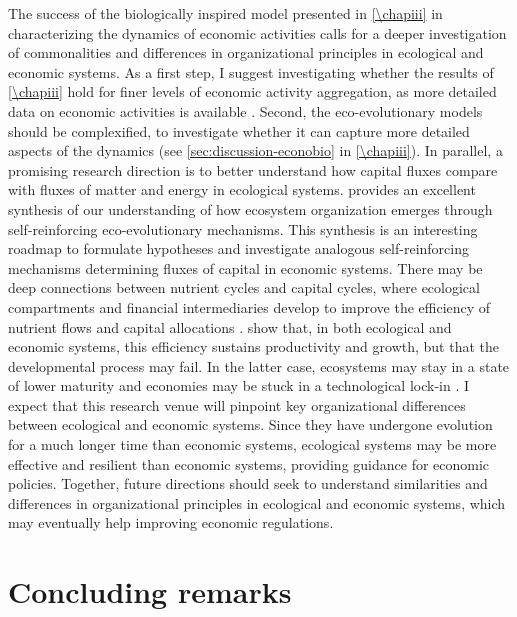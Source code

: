The success of the biologically inspired model presented in \cref{\chapiii}  in characterizing the dynamics of economic activities calls for a deeper investigation of commonalities and differences in organizational principles in ecological and economic systems.
% 
As a first step, I suggest investigating whether the results of \cref{\chapiii} hold for finer levels of economic activity aggregation, as more detailed data on economic activities is available \citep{Hausmann2011}. 
% 
Second, the eco-evolutionary models should be complexified, to investigate whether it can capture more detailed aspects of the dynamics (see \cref{sec:discussion-econobio} in \cref{\chapiii}).
% 
In parallel, a promising research direction is to better understand how capital fluxes \citep{King1993} compare with fluxes of matter and energy \citep{Veldhuis2018} in ecological systems.
% 
\cite{Veldhuis2018} provides an excellent synthesis of our understanding of how ecosystem organization emerges through self-reinforcing eco-evolutionary mechanisms. This synthesis is an interesting roadmap to formulate hypotheses and investigate analogous self-reinforcing mechanisms determining fluxes of capital in economic systems. 
% 
There may be deep connections between nutrient cycles and capital cycles, where ecological compartments and financial intermediaries develop to improve the efficiency of nutrient flows and capital allocations \citep{Odum1969}.
% 
\cite{Veldhuis2018,King1993} show that, in both ecological and economic systems, this efficiency sustains productivity and growth, but that the developmental process may fail. In the latter case, ecosystems may stay in a state of lower maturity \citep{Margalef1963} and economies may be stuck in a technological lock-in \citep{C.A.HidalgoB.Klinger}. 
% 
I expect that this research venue will pinpoint key organizational differences between ecological and economic systems. Since they have undergone evolution for a much longer time than economic systems, ecological systems may be more effective and resilient than economic systems, providing guidance for economic policies.
% 
Together, future directions should seek to understand similarities and differences in organizational principles in ecological and economic systems, which may eventually help improving economic regulations.


\section{Concluding remarks}


